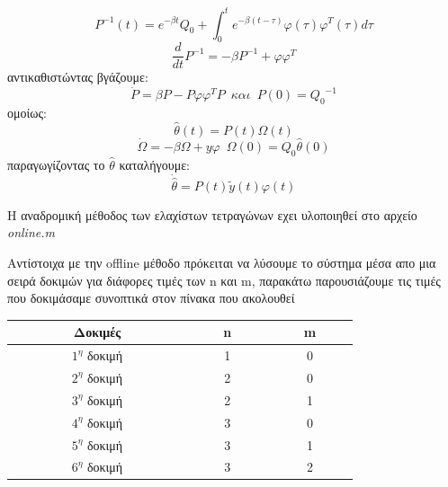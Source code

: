 \documentclass{article}
\begin{document}
\begin{equation*}
P^{-1}(t) = e^{-βt} Q_0 + \int_{0}^{t} e^{-β(t-τ)}φ(τ)φ^T(τ) dτ
\end{equation*}
\begin{equation*}
\frac{d}{dt}P^{-1} = -β P^{-1} + φφ^T
\end{equation*}
αντικαθιστώντας βγάζουμε:
\begin{equation*}
\boxed{\dot{P}=βP - Pφ φ^T P}\enspace και\enspace P(0)={Q_0}^{-1}
\end{equation*}
ομοίως:
\begin{equation*}
\hat{θ}(t) = P(t)Ω(t)
\end{equation*}
\begin{equation*}
\dot{Ω} = -βΩ +yφ \enspace Ω(0) = Q_0 \hat{θ}(0)
\end{equation*}
παραγωγίζοντας το $\hat{θ}$ καταλήγουμε:
\begin{equation*}
\boxed{
\dot{\hat{θ}} = P(t)\tilde{y}(t)φ(t)
}
\end{equation*}
\par H αναδρομική μέθοδος των ελαχίστων τετραγώνων εχει υλοποιηθεί στο αρχείο \textit{online.m}
 \par Αντίστοιχα με την offline μέθοδο πρόκειται να λύσουμε το σύστημα μέσα απο μια σειρά δοκιμών για διάφορες τιμές των n και m, παρακάτω παρουσιάζουμε τις τιμές που δοκιμάσαμε συνοπτικά στον πίνακα που ακολουθεί
\begin{center}
\begin{tabular}{ |c|c|c| } 
 \hline
$\qquad$ $\qquad$ Δοκιμές $\qquad$ $\qquad$ &$\qquad$ n $\qquad$& $\qquad$ m $\qquad$ \\ 
  \hline
 $1^{η}$ δοκιμή & 1 & 0 \\ 
  \hline
  $2^{η}$ δοκιμή & 2 & 0 \\ 
  \hline
   $3^{η}$ δοκιμή & 2 & 1 \\ 
  \hline
   $4^{η}$ δοκιμή & 3 & 0 \\ 
  \hline
   $5^{η}$ δοκιμή & 3 & 1 \\ 
  \hline
   $6^{η}$ δοκιμή & 3 & 2 \\ 
  \hline
 
\end{tabular}
\end{center}
\clearpage
\large
\end{document}
